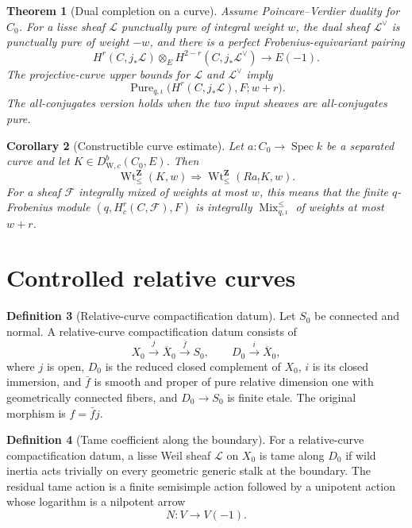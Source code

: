 \documentclass[10pt]{article}
\newtheorem{theorem}{Theorem}[section]
\newtheorem{corollary}[theorem]{Corollary}
\theoremstyle{definition}
\newtheorem{definition}[theorem]{Definition}
\newcommand{\WeilD}{D^b_{\mathrm W,c}}
\newcommand{\IntWtLe}{\operatorname{Wt}^{\mathbf Z}_{\leq}}
\newcommand{\MixLe}{\operatorname{Mix}^{\leq}}
\newcommand{\Pure}{\operatorname{Pure}}
\newcommand{\Spec}{\operatorname{Spec}}
\begin{document}
\begin{theorem}[Dual completion on a curve]
Assume Poincare--Verdier duality for \(C_0\).  For a lisse sheaf
\(\mathcal L\) punctually pure of integral weight \(w\), the dual sheaf
\(\mathcal L^\vee\) is punctually pure of weight \(-w\), and there is a
perfect Frobenius-equivariant pairing
\[
 H^r(C,j_*\mathcal L)\otimes_E
 H^{2-r}(C,j_*\mathcal L^\vee)
 \longrightarrow E(-1).
\]
The projective-curve upper bounds for \(\mathcal L\) and
\(\mathcal L^\vee\) imply
\[
 \Pure_{q,\iota}
 \bigl(H^r(C,j_*\mathcal L),F;w+r\bigr).
\]
The all-conjugates version holds when the two input sheaves are
all-conjugates pure.
\end{theorem}

\begin{corollary}[Constructible curve estimate]
Let \(a:C_0\to\Spec k\) be a separated curve and let
\(K\in\WeilD(C_0,E)\).  Then
\[
 \IntWtLe(K,w)\Longrightarrow\IntWtLe(Ra_!K,w).
\]
For a sheaf \(\mathcal F\) integrally mixed of weights at most \(w\), this
means that the finite \(q\)-Frobenius module
\((q,H_c^r(C,\mathcal F),F)\) is integrally
\(\MixLe_{q,\iota}\) of weights at most \(w+r\).
\end{corollary}

\section{Controlled relative curves}

\begin{definition}[Relative-curve compactification datum]
Let \(S_0\) be connected and normal.  A relative-curve compactification
datum consists of
\[
 X_0\xrightarrow{j}\overline X_0\xrightarrow{\bar f}S_0,
 \qquad D_0\xrightarrow{i}\overline X_0,
\]
where \(j\) is open, \(D_0\) is the reduced closed complement of \(X_0\),
\(i\) is its closed immersion, and \(\bar f\) is smooth and proper of pure relative
dimension one with geometrically connected fibers, and
\(D_0\to S_0\) is finite etale.  The original morphism is
\(f=\bar f j\).
\end{definition}

\begin{definition}[Tame coefficient along the boundary]
For a relative-curve compactification datum, a lisse Weil sheaf
\(\mathcal L\) on \(X_0\) is tame along \(D_0\) if wild inertia acts
trivially on every geometric generic stalk at the boundary.  The residual
tame action is a finite semisimple action followed by a unipotent action
whose logarithm is a nilpotent arrow
\[
                         N:V\longrightarrow V(-1).
\]
\end{definition}
\end{document}
